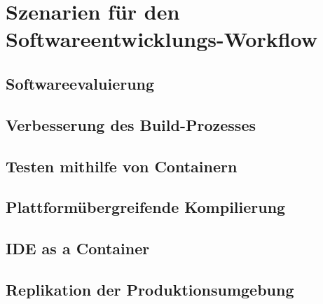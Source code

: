 \chapter{Szenarien für den Softwareentwicklungs-Workflow}
\label{cha:szenarien}
\section{Softwareevaluierung}
\label{sec:softwareevaluierung}
\section{Verbesserung des Build-Prozesses}
\label{sec:build-prozess-verbesserung}
\section{Testen mithilfe von Containern}
\label{sec:containerbasiertes-testen}
\section{Plattformübergreifende Kompilierung}
\label{sec:plattformuebergreifende-kompilierung}
\section{IDE as a Container}
\label{sec:ideasacontainer}
\section{Replikation der Produktionsumgebung}
\label{sec:replikation-produktionsumgebung}
